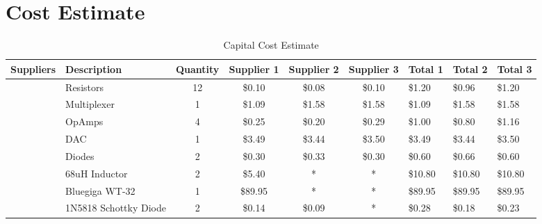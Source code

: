 \section [Cost]{Cost Estimate}

\begin{table}[htb!]
\addtolength{\tabcolsep}{-4pt}
\caption{Capital Cost Estimate}
\small
\begin{center}
\begin{tabular}{p{1.5cm}|p{2cm}cccc|p{1cm}p{1cm}p{1cm}}

 Suppliers & Description &   Quantity & Supplier 1 & Supplier 2 & Supplier 3 &    Total 1 &    Total 2 &    Total 3 \\
\hline
\cite{web:jameco-price, web:digikey-price, web:newark-price} &  Resistors &         12 &     \$0.10 &     \$0.08 &     \$0.10 &     \$1.20 &     \$0.96 &     \$1.20 \\

\cite{web:jameco-price, web:digikey-price, web:newark-price} & Multiplexer &          1 &     \$1.09 &     \$1.58 &     \$1.58 &     \$1.09 &     \$1.58 &     \$1.58 \\

\cite{web:jameco-price, web:wflorida-price, web:newark-price} &     OpAmps &          4 &     \$0.25 &     \$0.20 &     \$0.29 &     \$1.00 &     \$0.80 &     \$1.16 \\

\cite{web:mouser-price, web:newark-price, web:futurelec-price} &        DAC &          1 &     \$3.49 &     \$3.44 &     \$3.50 &     \$3.49 &     \$3.44 &     \$3.50 \\

\cite{web:digikey-price, web:newark-price, web:futurelec-price} &     Diodes &          2 &     \$0.30 &     \$0.33 &     \$0.30 &     \$0.60 &     \$0.66 &     \$0.60 \\
\hline
\cite{web:caddell-burns-price, web:gowanda-price} & 68uH Inductor &          2 &     \$5.40 &          * &          * &    \$10.80 &    \$10.80 &    \$10.80 \\

\cite{web:wt32-price} & Bluegiga WT-32 &          1 &    \$89.95 &          * &          * &    \$89.95 &    \$89.95 &    \$89.95 \\

\cite{web:newark-price, web:mouser-price} & 1N5818 Schottky Diode &          2 &     \$0.14 &     \$0.09 &          * &     \$0.28 &     \$0.18 &     \$0.23 \\


\end{tabular}
\end{center}
\end{table}

